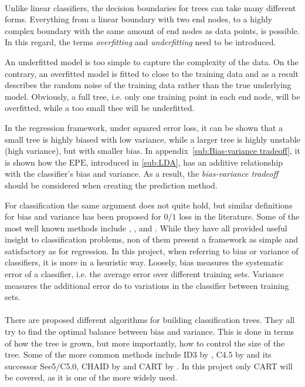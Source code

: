 \\
Unlike linear classifiers, the decision boundaries for trees can take many different forms. Everything from a linear boundary with two end nodes, to a highly complex boundary with the same amount of end nodes as data points, is possible. In this regard, the terms \textit{overfitting} and \textit{underfitting} need to be introduced. 

An underfitted model is too simple to capture the complexity of the data. On the contrary, an overfitted model is fitted to close to the training data and as a result describes the random noise of the training data rather than the true underlying model.  Obviously, a full tree, i.e. only one training point in each end node, will be overfitted, while a too small thee will be underfitted. 

In the regression framework, under squared error loss, it can be shown that a small tree is highly biased with low variance, while a larger tree is highly unstable (high variance), but with smaller bias. 
In appendix~\ref{sub:Bias-variance tradeoff}, it is shown how the $\mathrm{EPE}$, introduced in \ref{sub:LDA}, has an additive relationship with the classifier's bias and variance. As a result, the \textit{bias-variance tradeoff} should be considered when creating the prediction method. 

For classification the same argument does not quite hold, but similar definitions for bias and variance has been proposed for $0/1$ loss in the literature. Some of the most well known methods include \cite{kong1995error}, \cite{kohavi1996bias}, \cite{breiman1996bias} and \cite{Friedman1997bias}. While they have all provided useful insight to classification problems, non of them present a framework as simple and satisfactory as for regression. In this project, when referring to bias or variance of classifiers, it is more in a heuristic way. Loosely, bias measures the systematic error of a classifier, i.e. the average error over different training sets. Variance measures the additional error do to variations in the classifier between training sets. 
\\
\\
There are proposed different algorithms for building classification trees. They all try to find the optimal balance between bias and variance. This is done in terms of how the tree is grown, but more importantly, how to control the size of the tree. 
Some of the more common methods include ID3 by \cite{ID3}, C4.5 by \cite{C4.5} and its successor See5/C5.0, CHAID by \cite{CHAID} and CART by \cite{breiman}.
In this project only CART will be covered, as it is one of the more widely used.
%

